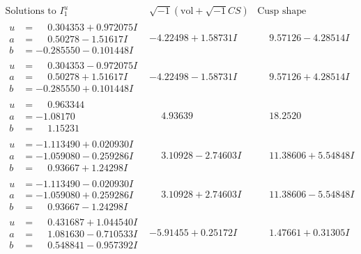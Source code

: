 \documentclass[1p]{elsarticle_modified}
\theoremstyle{definition}
\newcommand{\I}{\sqrt{-1}}
\begin{document}
$$\begin{array}{c|c|c}  
\text{Solutions to }I^u_{1}& \I (\text{vol} + \sqrt{-1}CS) & \text{Cusp shape}\\
 \hline 
\begin{aligned}
u &= \phantom{-}0.304353 + 0.972075 I \\
a &= \phantom{-}0.50278 - 1.51617 I \\
b &= -0.285550 - 0.101448 I\end{aligned}
 & -4.22498 + 1.58731 I & \phantom{-}9.57126 - 4.28514 I \\ \hline\begin{aligned}
u &= \phantom{-}0.304353 - 0.972075 I \\
a &= \phantom{-}0.50278 + 1.51617 I \\
b &= -0.285550 + 0.101448 I\end{aligned}
 & -4.22498 - 1.58731 I & \phantom{-}9.57126 + 4.28514 I \\ \hline\begin{aligned}
u &= \phantom{-}0.963344\phantom{ +0.000000I} \\
a &= -1.08170\phantom{ +0.000000I} \\
b &= \phantom{-}1.15231\phantom{ +0.000000I}\end{aligned}
 & \phantom{-}4.93639\phantom{ +0.000000I} & \phantom{-}18.2520\phantom{ +0.000000I} \\ \hline\begin{aligned}
u &= -1.113490 + 0.020930 I \\
a &= -1.059080 - 0.259286 I \\
b &= \phantom{-}0.93667 + 1.24298 I\end{aligned}
 & \phantom{-}3.10928 - 2.74603 I & \phantom{-}11.38606 + 5.54848 I \\ \hline\begin{aligned}
u &= -1.113490 - 0.020930 I \\
a &= -1.059080 + 0.259286 I \\
b &= \phantom{-}0.93667 - 1.24298 I\end{aligned}
 & \phantom{-}3.10928 + 2.74603 I & \phantom{-}11.38606 - 5.54848 I \\ \hline\begin{aligned}
u &= \phantom{-}0.431687 + 1.044540 I \\
a &= \phantom{-}1.081630 - 0.710533 I \\
b &= \phantom{-}0.548841 - 0.957392 I\end{aligned}
 & -5.91455 + 0.25172 I & \phantom{-}1.47661 + 0.31305 I \\ \hline\begin{aligned}

\end{aligned}
\end{array}$$
\end{document}
